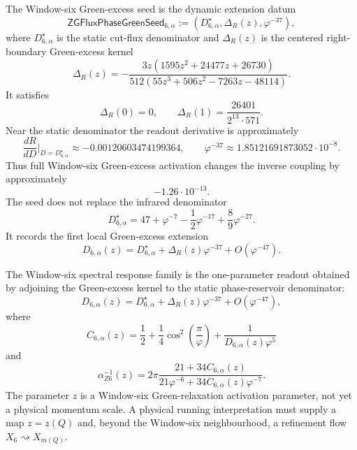 \begin{definition}
\label{def:zeckendorf-window-six-green-running-seed}
The Window-six Green-excess seed is the dynamic extension datum
$$
  \mathsf{ZGFluxPhaseGreenSeed}_{6,\alpha}
  :=
  \left(
    D_{6,\alpha}^{\star},
    \Delta_R(z),
    \varphi^{-37}
  \right),
$$
where $D_{6,\alpha}^{\star}$ is the static cut-flux denominator and
$\Delta_R(z)$ is the centered right-boundary Green-excess kernel
$$
  \Delta_R(z)
  =
  -
  \frac{
    3z(1595z^2+24477z+26730)
  }{
    512(55z^3+506z^2-7263z-48114)
  }.
$$
It satisfies
$$
  \Delta_R(0)=0,
  \qquad
  \Delta_R(1)
  =
  \frac{26401}{2^{13}\cdot571}.
$$
Near the static denominator the readout derivative is approximately
$$
  \frac{dR}{dD}\bigg|_{D=D_{6,\alpha}^{\star}}
  \approx
  -0.00120603474199364,
  \qquad
  \varphi^{-37}\approx1.85121691873052\cdot10^{-8}.
$$
Thus full Window-six Green-excess activation changes the inverse
coupling by approximately
$$
  -1.26\cdot10^{-13}.
$$
The seed does not replace the infrared denominator
$$
  D_{6,\alpha}^{\star}
  =
  47+\varphi^{-7}-\frac12\varphi^{-17}
  +\frac89\varphi^{-27}.
$$
It records the first local Green-excess extension
$$
  D_{6,\alpha}(z)
  =
  D_{6,\alpha}^{\star}
  +
  \Delta_R(z)\varphi^{-37}
  +
  O(\varphi^{-47}).
$$
\end{definition}

\begin{definition}
\label{def:zeckendorf-window-six-spectral-response-family}
The Window-six spectral response family is the one-parameter readout
obtained by adjoining the Green-excess kernel to the static
phase-reservoir denominator:
$$
  D_{6,\alpha}(z)
  =
  D_{6,\alpha}^{\star}
  +
  \Delta_R(z)\varphi^{-37}
  +
  O(\varphi^{-47}),
$$
where
$$
  C_{6,\alpha}(z)
  =
  \frac12
  +
  \frac14\cos^2\left(\frac{\pi}{\varphi}\right)
  +
  \frac{1}{D_{6,\alpha}(z)\varphi^5}
$$
and
$$
  \alpha_{Z6}^{-1}(z)
  =
  2\pi
  \frac{
    21+34C_{6,\alpha}(z)
  }{
    21\varphi^{-6}
    +
    34C_{6,\alpha}(z)\varphi^{-7}
  }.
$$
The parameter $z$ is a Window-six Green-relaxation activation parameter,
not yet a physical momentum scale. A physical running interpretation
must supply a map $z=z(Q)$ and, beyond the Window-six neighbourhood, a
refinement flow $X_6\rightsquigarrow X_{m(Q)}$.
\end{definition}

